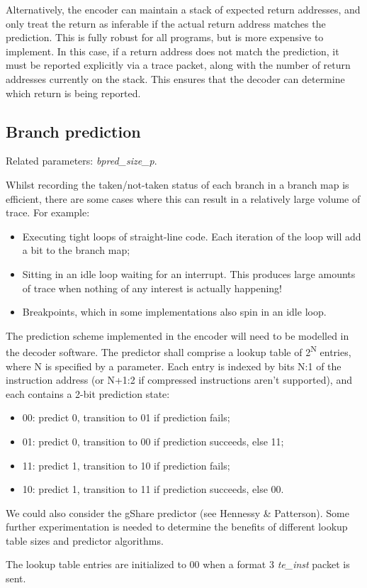 Alternatively, the encoder can maintain a stack of expected return addresses, and only treat the 
return as inferable if the actual return address matches the prediction.  This is fully robust for all
programs, but is more expensive to implement.  In this case, if a return address does not match the prediction, 
it must be reported explicitly via a trace packet, along with the number of return addresses
currently on the stack.  This ensures that the decoder can determine which return is being reported. 

\subsection{Branch prediction} \label{sec:branch-prediction}

Related parameters: \textit{bpred\_size\_p}.

Whilst recording the taken/not-taken status of each branch in a branch map is efficient, there are 
some cases where this can result in a relatively large volume of trace.  For example:

\begin{itemize}
  \item Executing tight loops of straight-line code.  Each iteration of the loop will add a bit to the branch map;
  \item Sitting in an idle loop waiting for an interrupt.  This produces large amounts of trace when nothing of 
  any interest is actually happening!  
  \item Breakpoints, which in some implementations also spin in an idle loop.
\end{itemize}

The prediction scheme implemented in the encoder will need to be modelled in the decoder software.  
The predictor shall comprise a lookup table of 2\textsuperscript{N} entries, where N is specified by a parameter.  
Each entry is indexed by bits N:1 of the instruction address (or N+1:2 if compressed instructions aren't supported), 
and each contains a 2-bit prediction state:
\begin{itemize}
  \item 00: predict 0, transition to 01 if prediction fails;
  \item 01: predict 0, transition to 00 if prediction succeeds, else 11;
  \item 11: predict 1, transition to 10 if prediction fails;
  \item 10: predict 1, transition to 11 if prediction succeeds, else 00.
\end{itemize}

We could also consider the gShare predictor (see Hennessy \& Patterson).  Some further experimentation is needed
to determine the benefits of different lookup table sizes and predictor algorithms.

The lookup table entries are initialized to 00 when a format 3 \textit{te\_inst} packet is sent.

